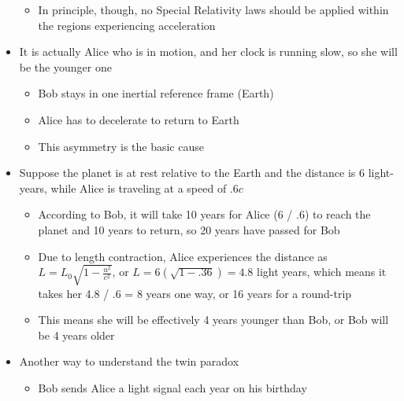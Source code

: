 \begin{itemize}
\begin{itemize}
      \item In principle, though, no Special Relativity laws should be applied within the regions experiencing acceleration

    \end{itemize}

  \item It is actually Alice who is in motion, and her clock is running slow, so she will be the younger one

    \begin{itemize}

      \item Bob stays in one inertial reference frame (Earth)

      \item Alice has to decelerate to return to Earth

      \item This asymmetry is the basic cause

    \end{itemize}

  \item Suppose the planet is at rest relative to the Earth and the distance is 6 light-years, while Alice is traveling at a speed of $.6c$

    \begin{itemize}

      \item According to Bob, it will take 10 years for Alice (6 / .6) to reach the planet and 10 years to return, so 20 years have passed for Bob

      \item Due to length contraction, Alice experiences the distance as $L=L_0\sqrt{1-\frac{u^2}{c^2}}$, or $L=6(\sqrt{1-.36})=4.8$ light years, which means it takes her 4.8 / .6 = 8 years one way, or 16 years for a round-trip

      \item This means she will be effectively 4 years younger than Bob, or Bob will be 4 years older

    \end{itemize}

  \item Another way to understand the twin paradox

    \begin{itemize}

      \item Bob sends Alice a light signal each year on his birthday


\end{itemize}
\end{itemize}
